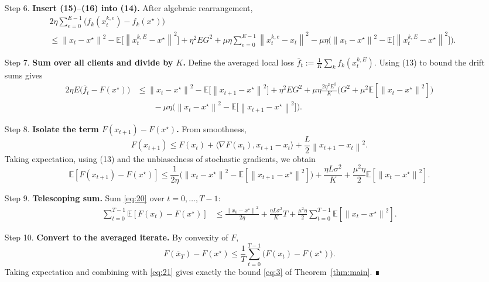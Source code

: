 \documentclass[11pt]{article}
\newcommand{\E}{\mathbb{E}}
\newcommand{\norm}[1]{\left\|#1\right\|}
\newcommand{\inner}[2]{\langle #1,#2\rangle}
\begin{document}
\begin{enumerate}
\item[Step 6.] \textbf{Insert (15)–(16) into (14).}  After algebraic rearrangement,
\[
\begin{aligned}
    &2\eta\sum_{e=0}^{E-1}\bigl(f_k(x_{t}^{k,e})-f_k(x^{\star})\bigr)\\
    &\le \norm{x_t-x^{\star}}^{2}
        -\E\!\bigl[\norm{x_{t}^{k,E}-x^{\star}}^{2}\bigr]
        +\eta^{2}E G^{2}
        +\mu\eta\sum_{e=0}^{E-1}\norm{x_{t}^{k,e}-x_t}^{2}
        -\mu\eta\bigl(\norm{x_t-x^{\star}}^{2}
                     -\E\!\bigl[\norm{x_{t}^{k,E}-x^{\star}}^{2}\bigr]\bigr).
\end{aligned}
\tag{17}
\]

\item[Step 7.] \textbf{Sum over all clients and divide by $K$.}  
Define the averaged local loss $ \bar f_t:=\frac1K\sum_{k}f_k(x_{t}^{k,E}) $.  Using (13) to bound the drift sums gives
\[
\begin{aligned}
    2\eta E\bigl(\bar f_t-F(x^{\star})\bigr)
    &\le \norm{x_t-x^{\star}}^{2}
          -\E\!\bigl[\norm{x_{t+1}-x^{\star}}^{2}\bigr]
          +\eta^{2}E G^{2}
          +\mu\eta\frac{2\eta^{2}E^{2}}{K}\bigl(G^{2}+\mu^{2}\E[\norm{x_t-x^{\star}}^{2}]\bigr)\\
    &\qquad -\mu\eta\bigl(\norm{x_t-x^{\star}}^{2}
          -\E\!\bigl[\norm{x_{t+1}-x^{\star}}^{2}\bigr]\bigr).
\end{aligned}
\tag{18}
\]

\item[Step 8.] \textbf{Isolate the term $F(x_{t+1})-F(x^{\star})$.}  
From smoothness,
\[
    F(x_{t+1})\le F(x_t)+\inner{\nabla F(x_t)}{x_{t+1}-x_t}
                 +\frac{L}{2}\norm{x_{t+1}-x_t}^{2}.
\tag{19}
\]
Taking expectation, using (13) and the unbiasedness of stochastic gradients, we obtain
\[
    \E[F(x_{t+1})-F(x^{\star})]
    \le \frac{1}{2\eta}\bigl(\norm{x_t-x^{\star}}^{2}
          -\E[\norm{x_{t+1}-x^{\star}}^{2}]\bigr)
          +\frac{\eta L\sigma^{2}}{K}
          +\frac{\mu^{2}\eta}{2}\E[\norm{x_t-x^{\star}}^{2}].
\tag{20}
\]

\item[Step 9.] \textbf{Telescoping sum.}  
Sum \eqref{eq:20} over $t=0,\dots,T-1$:
\[
\begin{aligned}
    \sum_{t=0}^{T-1}\E[F(x_t)-F(x^{\star})]
    &\le
    \frac{\norm{x_0-x^{\star}}^{2}}{2\eta}
    +\frac{\eta L\sigma^{2}}{K}T
    +\frac{\mu^{2}\eta}{2}\sum_{t=0}^{T-1}\E[\norm{x_t-x^{\star}}^{2}].
\end{aligned}
\tag{21}
\]

\item[Step 10.] \textbf{Convert to the averaged iterate.}  
By convexity of $F$,
\[
    F(\bar x_T)-F(x^{\star})
    \le \frac1T\sum_{t=0}^{T-1}\bigl(F(x_t)-F(x^{\star})\bigr).
\tag{22}
\]
Taking expectation and combining with \eqref{eq:21} gives exactly the bound \eqref{eq:3} of Theorem~\ref{thm:main}.  ∎
\end{enumerate}
\end{document}
